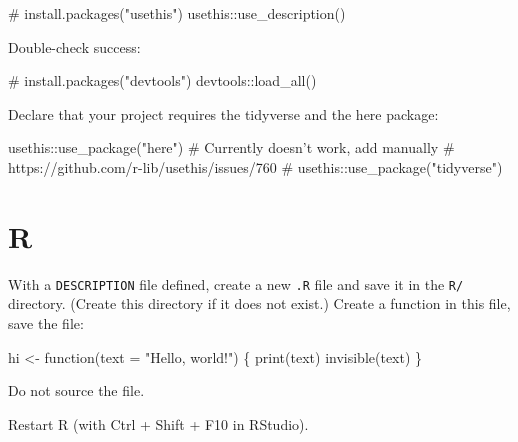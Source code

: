 \documentclass[]{book}
\newenvironment{Shaded}{}{}
\newcommand{\CommentTok}[1]{\textcolor[rgb]{0.00,0.50,0.00}{#1}}
\newcommand{\ControlFlowTok}[1]{\textcolor[rgb]{0.00,0.00,1.00}{#1}}
\newcommand{\DataTypeTok}[1]{#1}
\newcommand{\KeywordTok}[1]{\textcolor[rgb]{0.00,0.00,1.00}{#1}}
\newcommand{\NormalTok}[1]{#1}
\newcommand{\OperatorTok}[1]{#1}
\newcommand{\StringTok}[1]{\textcolor[rgb]{0.00,0.50,0.50}{#1}}
\begin{document}
\begin{Shaded}
\begin{Highlighting}[]
\CommentTok{# install.packages("usethis")}
\NormalTok{usethis}\OperatorTok{::}\KeywordTok{use_description}\NormalTok{()}
\end{Highlighting}
\end{Shaded}

Double-check success:

\begin{Shaded}
\begin{Highlighting}[]
\CommentTok{# install.packages("devtools")}
\NormalTok{devtools}\OperatorTok{::}\KeywordTok{load_all}\NormalTok{()}
\end{Highlighting}
\end{Shaded}

Declare that your project requires the tidyverse and the here package:

\begin{Shaded}
\begin{Highlighting}[]
\NormalTok{usethis}\OperatorTok{::}\KeywordTok{use_package}\NormalTok{(}\StringTok{"here"}\NormalTok{)}
\CommentTok{# Currently doesn't work, add manually}
\CommentTok{# https://github.com/r-lib/usethis/issues/760}
\CommentTok{# usethis::use_package("tidyverse")}
\end{Highlighting}
\end{Shaded}

\hypertarget{r}{%
\section{R}\label{r}}

With a \texttt{DESCRIPTION} file defined, create a new \texttt{.R} file and save it in the \texttt{R/} directory.
(Create this directory if it does not exist.)
Create a function in this file, save the file:

\begin{Shaded}
\begin{Highlighting}[]
\NormalTok{hi <-}\StringTok{ }\ControlFlowTok{function}\NormalTok{(}\DataTypeTok{text =} \StringTok{"Hello, world!"}\NormalTok{) \{}
  \KeywordTok{print}\NormalTok{(text)}
  \KeywordTok{invisible}\NormalTok{(text)}
\NormalTok{\}}
\end{Highlighting}
\end{Shaded}

Do not source the file.

Restart R (with Ctrl + Shift + F10 in RStudio).
\end{document}
